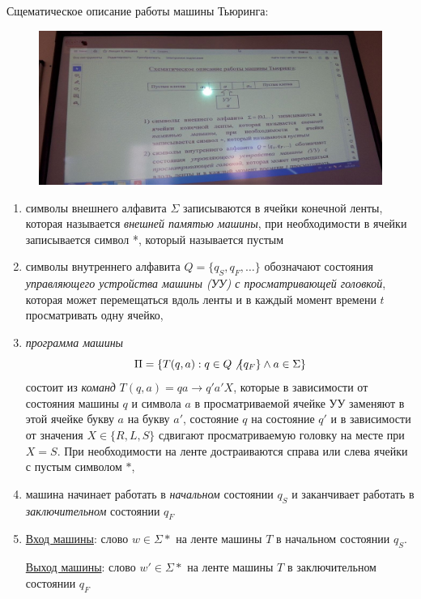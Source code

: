 \documentclass{article}
\begin{document}
Сщематическое описание работы машины Тьюринга:
\begin{figure}[h!]
    \includegraphics[width=\textwidth]{3.jpg}
\end{figure}
\begin{enumerate}
    \item символы внешнего алфавита $\Sigma$ записываются в ячейки конечной ленты, которая называется \textit{внешней памятью машины}, при необходимости в ячейки записывается символ *, который называется пустым
    \item символы внутреннего алфавита $Q = \{q_S, q_F, \dots\}$ обозначают состояния \textit{управляющего устройства машины (УУ) с просматривающей головкой}, которая может перемещаться вдоль ленты и в каждый момент времени $t$ просматривать одну ячейко,
    \item \textit{программа машины}
    \begin{equation}
        \Pi = \{T(q,a) : q \in Q \not \{q_F\} \land a \in \Sigma\}
    \end{equation}
    состоит из \textit{команд} $T(q, a) = qa \to q'a'X$, которые в зависимости от состояния машины $q$ и символа $a$ в просматриваемой ячейке УУ заменяют в этой ячейке букву $a$ на букву $a'$, состояние $q$ на состояние $q'$ и в зависимости от значения $X \in \{R, L, S\}$ сдвигают просматриваемую головку на месте при $X = S$. При необходимости на ленте достраиваются справа или слева ячейки с пустым символом $*$,
    \item машина начинает работать в \textit{начальном} состоянии $q_S$ и заканчивает работать в \textit{заключительном} состоянии $q_F$
    \item \underline{Вход машины}: слово $w \in \Sigma*$ на ленте машины $T$ в начальном состоянии $q_S$.

    \underline{Выход машины}: слово $w' \in \Sigma*$ на ленте машины $T$ в заключительном состоянии $q_F$
\end{enumerate}
\end{document}
